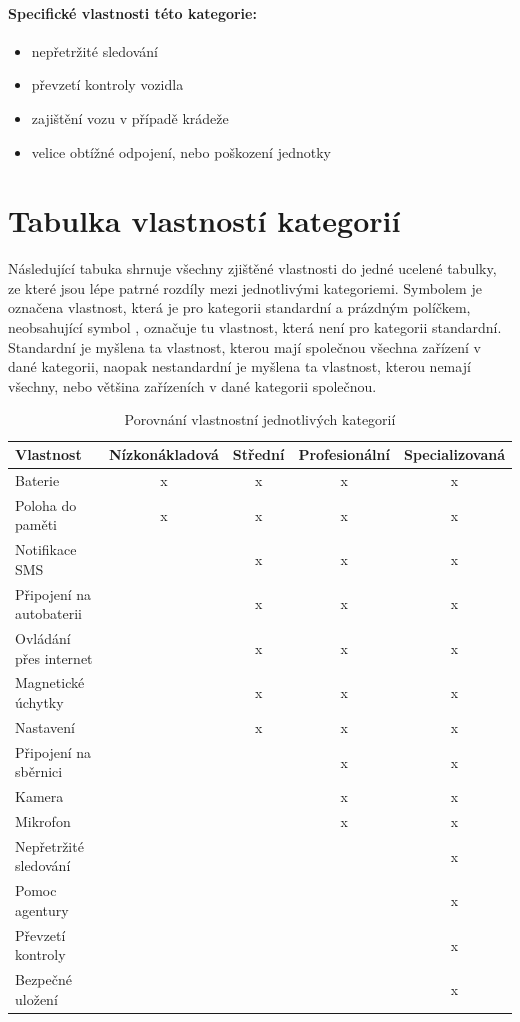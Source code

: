 \documentclass[FM,BP]{tulthesis}  %
\begin{document}
\paragraph{Specifické vlastnosti této kategorie:}
\begin{itemize}
\item nepřetržité sledování
\item převzetí kontroly vozidla
\item zajištění vozu v případě krádeže
\item velice obtížné odpojení, nebo poškození jednotky
\end{itemize}


\section{Tabulka vlastností kategorií}
Následující tabuka shrnuje všechny zjištěné vlastnosti do jedné ucelené tabulky, ze které jsou lépe patrné rozdíly mezi jednotlivými kategoriemi. Symbolem  je označena vlastnost, která je pro kategorii standardní a prázdným políčkem, neobsahující symbol , označuje tu vlastnost, která není pro kategorii standardní. Standardní je myšlena ta vlastnost, kterou mají společnou všechna zařízení v dané kategorii, naopak nestandardní je myšlena ta vlastnost, kterou nemají všechny, nebo většina zařízeních v dané kategorii společnou.

\renewcommand{\arraystretch}{1.5}
\begin{table}[H]
\begin{center}
\begin{tabular}{| l | c | c| c | c |}
\hline
Vlastnost & Nízkonákladová & Střední & Profesionální & Specializovaná\\
\hline
\hline
Baterie & x & x & x & x\\
\hline
Poloha do paměti & x & x & x & x\\
\hline
Notifikace SMS & & x & x & x\\
\hline
Připojení na autobaterii & & x & x & x\\
\hline
Ovládání přes internet & & x & x & x\\
\hline
Magnetické úchytky & & x & x & x\\
\hline
Nastavení & & x & x & x\\
\hline
Připojení na sběrnici & & & x & x\\
\hline
Kamera & & & x & x\\
\hline
Mikrofon & & & x & x\\
\hline
Nepřetržité sledování & & & & x\\
\hline
Pomoc agentury & & & & x\\
\hline
Převzetí kontroly & & & & x\\
\hline
Bezpečné uložení & & & & x\\
\hline
\end{tabular}
\end{center}
\caption{Porovnání vlastnostní jednotlivých kategorií}
\end{table}
\end{document}
